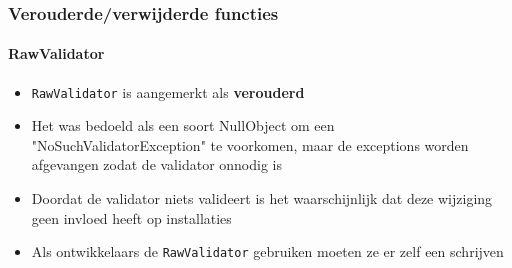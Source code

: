 %
%
%
%
%
%
%
%
%


\begin{frame}[fragile]
	\frametitle{Verouderde/verwijderde functies}
	\framesubtitle{RawValidator}

	\begin{itemize}
		\item \texttt{RawValidator} is aangemerkt als \textbf{verouderd}
		\item Het was bedoeld als een soort NullObject om een "NoSuchValidatorException" te voorkomen,
			maar de exceptions worden afgevangen zodat de validator onnodig is
		\item Doordat de validator niets valideert is het waarschijnlijk dat deze wijziging geen
			invloed heeft op installaties
		\item Als ontwikkelaars de \texttt{RawValidator} gebruiken moeten ze er zelf een schrijven
	\end{itemize}


\end{frame}

